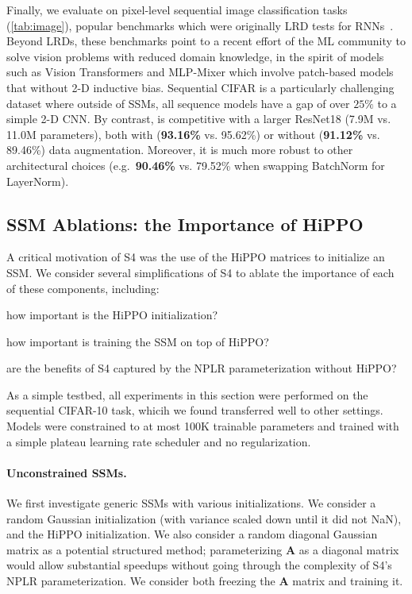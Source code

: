 Finally,
we evaluate \methodabbrv{} on pixel-level sequential image classification tasks (\cref{tab:image}),
popular benchmarks which were originally LRD tests for RNNs~\citep{arjovsky2016unitary}.
Beyond LRDs, these benchmarks point to a recent effort of the ML community to solve vision
problems with reduced domain knowledge,
in the spirit of models such as Vision Transformers \citep{dosovitskiy2020image} and MLP-Mixer \citep{tolstikhin2021mlp} which involve patch-based models that without 2-D inductive bias.
Sequential CIFAR is a particularly challenging dataset where outside of SSMs, all sequence models have a gap of over $25\%$ to a simple 2-D CNN.
By contrast, \methodabbrv{} is competitive with a larger ResNet18 (7.9M vs. 11.0M parameters), both with (\textbf{93.16\%} vs. 95.62\%) or without (\textbf{91.12\%} vs. 89.46\%) data augmentation.
Moreover, it is much more robust to other architectural choices (e.g.\ \textbf{90.46\%} vs. 79.52\% when swapping BatchNorm for LayerNorm).

\subsection{SSM Ablations: the Importance of HiPPO}
A critical motivation of S4 was the use of the HiPPO matrices to initialize an SSM.
We consider several simplifications of S4 to ablate the importance of each of these components, including:
\begin{enumerate*}[label=(\roman*)]%
  \item how important is the HiPPO initialization?
  \item how important is training the SSM on top of HiPPO?
  \item are the benefits of S4 captured by the NPLR parameterization without HiPPO?
\end{enumerate*}

As a simple testbed, all experiments in this section were performed on the sequential CIFAR-10 task,
whicih we found transferred well to other settings.
Models were constrained to at most 100K trainable parameters and trained with a simple plateau learning rate scheduler and no regularization.

\paragraph{Unconstrained SSMs.}
We first investigate generic SSMs with various initializations.
We consider a random Gaussian initialization (with variance scaled down until it did not NaN),  and the HiPPO initialization.
We also consider a random diagonal Gaussian matrix as a potential structured method; parameterizing \( \bm{A} \) as a diagonal matrix would allow substantial speedups without going through the complexity of S4's NPLR parameterization.
We consider both freezing the \( \bm{A} \) matrix and training it.


